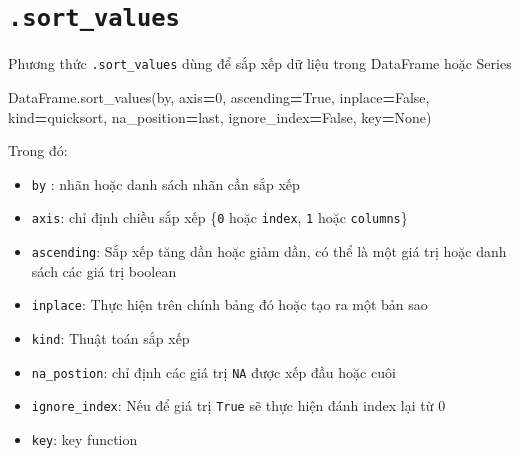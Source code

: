 \documentclass[
]{book}
\newenvironment{Shaded}{\begin{snugshade}}{\end{snugshade}}
\newcommand{\DecValTok}[1]{\textcolor[rgb]{0.00,0.00,0.81}{#1}}
\newcommand{\NormalTok}[1]{#1}
\newcommand{\OperatorTok}[1]{\textcolor[rgb]{0.81,0.36,0.00}{\textbf{#1}}}
\newcommand{\StringTok}[1]{\textcolor[rgb]{0.31,0.60,0.02}{#1}}
\newcommand{\VariableTok}[1]{\textcolor[rgb]{0.00,0.00,0.00}{#1}}
\begin{document}
\section{\texorpdfstring{\texttt{.sort\_values}}{.sort\_values}}\label{sort_values}

Phương thức \texttt{.sort\_values} dùng để sắp xếp dữ liệu trong DataFrame hoặc Series

\begin{Shaded}
\begin{Highlighting}[]
\NormalTok{DataFrame.sort\_values(by, axis}\OperatorTok{=}\DecValTok{0}\NormalTok{, ascending}\OperatorTok{=}\VariableTok{True}\NormalTok{, inplace}\OperatorTok{=}\VariableTok{False}\NormalTok{, kind}\OperatorTok{=}\StringTok{\textquotesingle{}quicksort\textquotesingle{}}\NormalTok{, na\_position}\OperatorTok{=}\StringTok{\textquotesingle{}last\textquotesingle{}}\NormalTok{, ignore\_index}\OperatorTok{=}\VariableTok{False}\NormalTok{, key}\OperatorTok{=}\VariableTok{None}\NormalTok{)}
\end{Highlighting}
\end{Shaded}

Trong đó:

\begin{itemize}
\item
  \texttt{by} : nhãn hoặc danh sách nhãn cần sắp xếp
\item
  \texttt{axis}: chỉ định chiều sắp xếp \{\texttt{0} hoặc \texttt{index}, \texttt{1} hoặc \texttt{columns}\}
\item
  \texttt{ascending}: Sắp xếp tăng dần hoặc giảm dần, có thể là một giá trị hoặc danh sách các giá trị boolean
\item
  \texttt{inplace}: Thực hiện trên chính bảng đó hoặc tạo ra một bản sao
\item
  \texttt{kind}: Thuật toán sắp xếp
\item
  \texttt{na\_postion}: chỉ định các giá trị \texttt{NA} được xếp đầu hoặc cuôi
\item
  \texttt{ignore\_index}: Nếu để giá trị \texttt{True} sẽ thực hiện đánh index lại từ 0
\item
  \texttt{key}: key function
\end{itemize}
\end{document}

